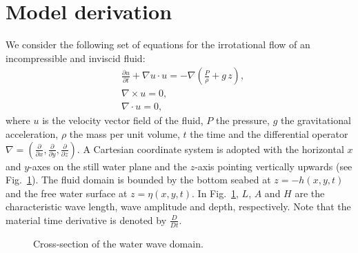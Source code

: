 \section{Model derivation}\label{sec:lopes:modelderivation}
We consider the following set of equations for the
irrotational flow of an incompressible and inviscid fluid:
\begin{subequations}\label{eq:lopes:euler}
\begin{align}
&\displaystyle\frac{\partial u}{\partial t}+\nabla u \cdot
  u=-\nabla\left(\frac{P}{\rho} +g\,
  z\right),\label{eq:lopes:euler-a} \\ &\nabla\times
  u={0},\label{eq:lopes:euler-b}
  \\ &\nabla\cdot{u}=0,\label{eq:lopes:euler-c}
\end{align}
\end{subequations}
where $u$ is the velocity vector field of the fluid, $P$ the
pressure, $g$ the gravitational acceleration, $\rho$ the
mass per unit volume, $t$ the time and the differential
operator
$\nabla=\left(\frac{\partial }{\partial x},\frac{\partial
}{\partial y},\frac{\partial }{\partial z}\right).$ A
Cartesian coordinate system is adopted with the horizontal
$x$ and $y$-axes on the still water plane and the $z$-axis
pointing vertically upwards (see
Fig.~\ref{fig:lopes:schematic}).  The fluid domain is
bounded by the bottom seabed at $z=-h(x,y,t)$ and the free
water surface at $z=\eta(x,y,t)$.
In Fig.~\ref{fig:lopes:schematic}, $L$, $A$ and $H$ are the
characteristic wave length, wave amplitude and depth,
respectively. Note that the material time derivative is
denoted by $\frac{D}{D t}$.
\begin{figure}
\begin{center}
\end{center}
\caption{Cross-section of the water wave domain.}
\label{fig:lopes:schematic}
\end{figure}

